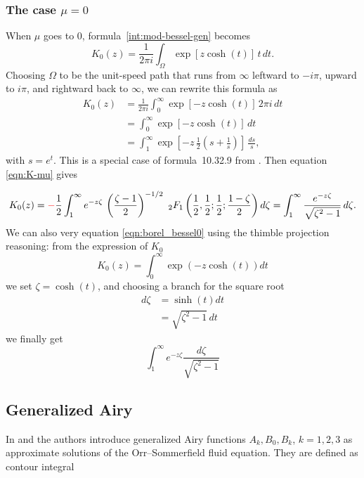 \documentclass{article}
\theoremstyle{definition}
\theoremstyle{plain}
\newenvironment{verify}{\color{ForestGreen}}{\color{black}}
\begin{document}
\subsubsection{The case $\mu=0$}
When $\mu$ goes to $0$, formula~\eqref{int:mod-bessel-gen} becomes
\[ K_0(z) = \frac{1}{2\pi i} \int_\Omega \exp\left[z \cosh(t)\right]\,t\,dt. \]
Choosing $\Omega$ to be the unit-speed path that runs from $\infty$ leftward to $-i\pi$, upward to $i\pi$, and rightward back to $\infty$, we can rewrite this formula as
\begin{align*}
K_0(z) & = \frac{1}{2\pi i} \int_0^\infty \exp\left[-z \cosh(t)\right]\,2\pi i\,dt \\
& = \int_0^\infty \exp\left[-z \cosh(t)\right]\,dt \\
& = \int_1^\infty \exp\left[-z\,\tfrac{1}{2}\left(s + \tfrac{1}{s}\right)\right]\,\frac{ds}{s},
\end{align*}
with $s = e^t$. This is a special case of formula~10.32.9 from \cite{dlmf}. Then equation \eqref{eqn:K-mu} gives

\begin{equation}\label{eqn:borel_bessel0}
    K_0(z)=\textcolor{red}{-}\frac{1}{2}\int_1^\infty e^{-z\zeta} \, \left(\frac{\zeta-1}{2}\right)^{-1/2} \,\, {}_2F_1\left(\frac{1}{2}, \frac{1}{2};\frac{1}{2};\frac{1-\zeta}{2}\right)  d\zeta =  \int_1^\infty \frac{e^{-z\zeta}}{\sqrt{\zeta^2-1}} \, d\zeta .
\end{equation}
\begin{verify}
    We can also very equation \eqref{eqn:borel_bessel0} using the thimble projection reasoning: from the expression of $K_0$ 
    \begin{equation}
        K_0(z)=\int_0^{\infty} \exp(-z\cosh(t)) dt
    \end{equation}
    we set $\zeta=\cosh(t)$, and choosing a branch for the square root
    \begin{align*}
        d\zeta & = \sinh(t) dt\\
        & =  \sqrt{\zeta^2-1} \, dt
    \end{align*}
    we finally get 
    \[\int_1^{\infty} e^{-z\zeta} \frac{d\zeta}{\sqrt{\zeta^2-1}}\]
\end{verify}



\subsection{Generalized Airy}
In \cite{Reid} and \cite[Appendix]{drazin-reid} the authors introduce generalized Airy functions $A_k, B_0, B_k$, $k=1,2,3$ as approximate solutions of the Orr--Sommerfield fluid equation. They are defined as contour integral \cite[Section 9.13(ii)]{dlmf}
\end{document}

